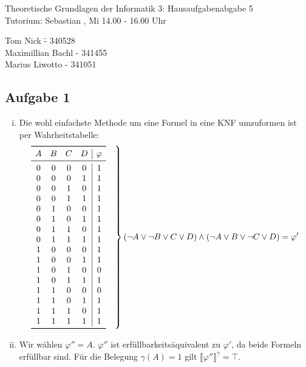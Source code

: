\documentclass[a4paper,10pt]{article}
\begin{document}
\begin{center}
\Large{Theoretische Grundlagen der Informatik 3: Hausaufgabenabgabe 5} \\
\large{Tutorium: Sebastian , Mi 14.00 - 16.00 Uhr}
\end{center}
\begin{tabbing}
Tom Nick \hspace{2cm}\= - 340528\\
Maximillian Bachl \> - 341455 \\
Marius Liwotto\> -  341051
\end{tabbing}
\subsection*{Aufgabe 1}
\begin{enumerate}[(i)]
\item 	Die wohl einfachste Methode um eine Formel in eine KNF umzuformen ist per Wahrheitstabelle:
	\[
	\left.\begin{array}{cccc|c}
		\toprule 
		A & B & C & D & \varphi\\
		\midrule
		0 & 0 & 0 & 0 & 1\\
		0 & 0 & 0 & 1 & 1\\
		0 & 0 & 1 & 0 & 1\\
		0 & 0 & 1 & 1 & 1\\
		0 & 1 & 0 & 0 & 1\\
		0 & 1 & 0 & 1 & 1\\
		0 & 1 & 1 & 0 & 1\\
		0 & 1 & 1 & 1 & 1\\
		1 & 0 & 0 & 0 & 1\\
		1 & 0 & 0 & 1 & 1\\
		1 & 0 & 1 & 0 & 0\\
		1 & 0 & 1 & 1 & 1\\
		1 & 1 & 0 & 0 & 0\\
		1 & 1 & 0 & 1 & 1\\
		1 & 1 & 1 & 0 & 1\\
		1 & 1 & 1 & 1 & 1\\
		\bottomrule
		\end{array} \quad \right\} ( \lnot A \lor  \lnot B \lor C \lor D) \land (\lnot A \lor B \lor \lnot C \lor D) = \varphi'
	 \]
\item
	Wir wählen $\varphi'' = A$. $\varphi''$ ist erfüllbarkeitsäquivalent zu $\varphi'$, da beide Formeln erfüllbar sind. Für die Belegung $\gamma(A) = 1$ gilt $\llbracket \varphi'' \rrbracket^{\gamma} = \top$. 
 \end{enumerate}
\end{document}
